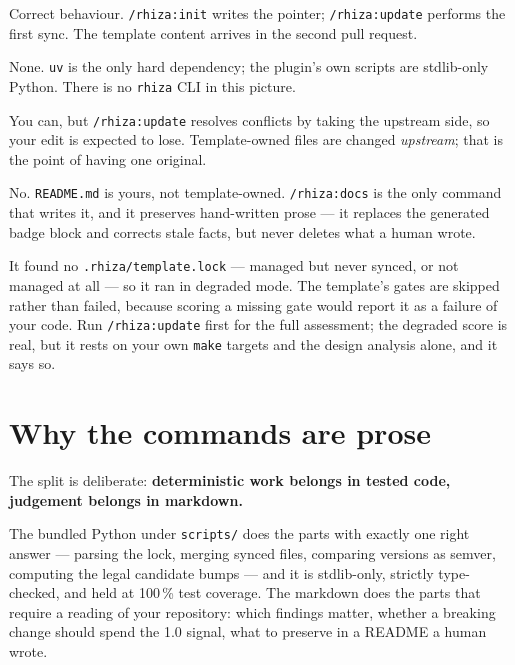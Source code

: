 \documentclass[11pt,a4paper]{article}
\newcommand{\cmd}[1]{\texttt{/rhiza:#1}}
\newcommand{\file}[1]{\texttt{#1}}
\begin{document}
\begin{description}[leftmargin=0pt, style=nextline, itemsep=0.35em]
  \item[``\cmd{init} finished but no CI appeared.'']
        Correct behaviour. \cmd{init} writes the pointer; \cmd{update} performs the
        first sync. The template content arrives in the second pull request.
  \item[``Which CLI do I have to install?'']
        None. \texttt{uv} is the only hard dependency; the plugin's own scripts are
        stdlib-only Python. There is no \texttt{rhiza} CLI in this picture.
  \item[``Can I edit a synced file?'']
        You can, but \cmd{update} resolves conflicts by taking the upstream side, so
        your edit is expected to lose. Template-owned files are changed
        \emph{upstream}; that is the point of having one original.
  \item[``Will a sync overwrite my README?'']
        No. \file{README.md} is yours, not template-owned. \cmd{docs} is the only
        command that writes it, and it preserves hand-written prose --- it replaces the
        generated badge block and corrects stale facts, but never deletes what a human
        wrote.
  \item[``\cmd{quality} scored me on almost nothing.'']
        It found no \file{.rhiza/template.lock} --- managed but never synced, or not
        managed at all --- so it ran in degraded mode. The template's gates are skipped rather
        than failed, because scoring a missing gate would report it as a failure of your
        code. Run \cmd{update} first for the full assessment; the degraded score is real,
        but it rests on your own \texttt{make} targets and the design analysis alone, and
        it says so.
\end{description}

\section{Why the commands are prose}

The split is deliberate: \textbf{deterministic work belongs in tested code, judgement
belongs in markdown.}

The bundled Python under \file{scripts/} does the parts with exactly one right answer
--- parsing the lock, merging synced files, comparing versions as semver, computing the
legal candidate bumps --- and it is stdlib-only, strictly type-checked, and held at
100\,\% test coverage. The markdown does the parts that require a reading of your
repository: which findings matter, whether a breaking change should spend the 1.0
signal, what to preserve in a README a human wrote.
\end{document}
